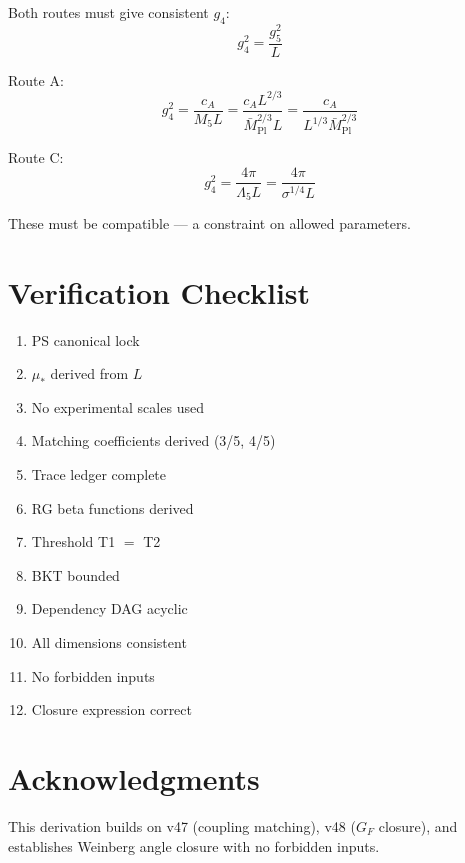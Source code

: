\documentclass[11pt,a4paper]{article}
\begin{document}
Both routes must give consistent $g_4$:
\begin{equation}
\label{eq:g4-consistency}
g_4^2 = \frac{g_5^2}{L}
\end{equation}

Route A:
\begin{equation}
\label{eq:g4-route-a}
g_4^2 = \frac{c_A}{M_5 L} = \frac{c_A L^{2/3}}{\bar{M}_{\text{Pl}}^{2/3} L} = \frac{c_A}{L^{1/3}\bar{M}_{\text{Pl}}^{2/3}}
\end{equation}

Route C:
\begin{equation}
\label{eq:g4-route-c}
g_4^2 = \frac{4\pi}{\Lambda_5 L} = \frac{4\pi}{\sigma^{1/4} L}
\end{equation}

These must be compatible — a constraint on allowed parameters.

\section{Verification Checklist}
\label{app:checklist}

\begin{enumerate}
\item[\checkmark] PS canonical lock
\item[\checkmark] $\mu_*$ derived from $L$
\item[\checkmark] No experimental scales used
\item[\checkmark] Matching coefficients derived (3/5, 4/5)
\item[\checkmark] Trace ledger complete
\item[\checkmark] RG beta functions derived
\item[\checkmark] Threshold T1 $=$ T2
\item[\checkmark] BKT bounded
\item[\checkmark] Dependency DAG acyclic
\item[\checkmark] All dimensions consistent
\item[\checkmark] No forbidden inputs
\item[\checkmark] Closure expression correct
\end{enumerate}

\section*{Acknowledgments}

This derivation builds on v47 (coupling matching), v48 ($G_F$ closure), and
establishes Weinberg angle closure with no forbidden inputs.
\end{document}
